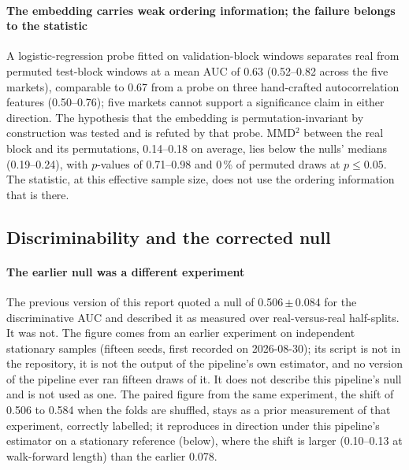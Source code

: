\documentclass[11pt,a4paper]{article}
\makeatletter
\DeclareRobustCommand{\_}{\ifmmode\nfss@text{\textunderscore}\else\textunderscore\allowbreak\fi}
\makeatother
\begin{document}
\paragraph{The embedding carries weak ordering information; the failure belongs to the statistic} A logistic-regression probe fitted on validation-block windows separates real from permuted test-block windows at a mean AUC of 0.63 (0.52--0.82 across the five markets), comparable to 0.67 from a probe on three hand-crafted autocorrelation features (0.50--0.76); five markets cannot support a significance claim in either direction. The hypothesis that the embedding is permutation-invariant by construction was tested and is refuted by that probe. MMD$^2$ between the real block and its permutations, 0.14--0.18 on average, lies below the nulls' medians (0.19--0.24), with $p$-values of 0.71--0.98 and 0\,\% of permuted draws at $p\le0.05$. The statistic, at this effective sample size, does not use the ordering information that is there.

\subsection{Discriminability and the corrected null}
\label{sec:walkforward}

\paragraph{The earlier null was a different experiment} The previous version of this report quoted a null of 0.506\,$\pm$\,0.084 for the discriminative AUC and described it as measured over real-versus-real half-splits. It was not. The figure comes from an earlier experiment on independent stationary samples (fifteen seeds, first recorded on 2026-08-30); its script is not in the repository, it is not the output of the pipeline's own estimator, and no version of the pipeline ever ran fifteen draws of it. It does not describe this pipeline's null and is not used as one. The paired figure from the same experiment, the shift of 0.506 to 0.584 when the folds are shuffled, stays as a prior measurement of that experiment, correctly labelled; it reproduces in direction under this pipeline's estimator on a stationary reference (below), where the shift is larger (0.10--0.13 at walk-forward length) than the earlier 0.078.
\end{document}
